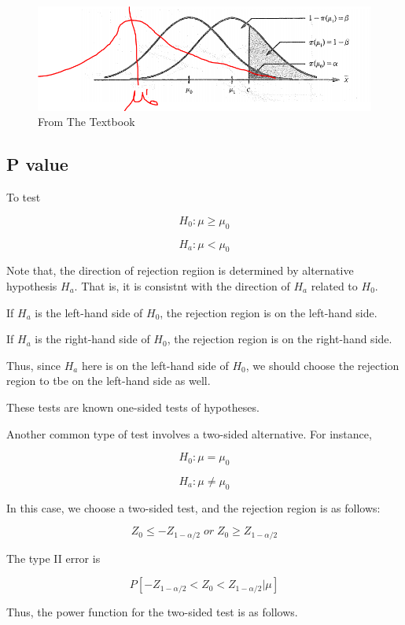 \documentclass[]{book}
\begin{document}
\begin{figure}
\centering
\includegraphics{556_2.PNG}
\caption{From The Textbook}
\end{figure}

\hypertarget{p-value}{%
\subsection{P value}\label{p-value}}

To test

\[H_0: \mu \geq \mu_0\]

\[H_a:\mu < \mu_0\]

Note that, the direction of rejection regiion is determined by alternative hypothesis \(H_a\). That is, it is consistnt with the direction of \(H_a\) related to \(H_0\).

If \(H_a\) is the left-hand side of \(H_0\), the rejection region is on the left-hand side.

If \(H_a\) is the right-hand side of \(H_0\), the rejection region is on the right-hand side.

Thus, since \(H_a\) here is on the left-hand side of \(H_0\), we should choose the rejection region to tbe on the left-hand side as well.

These tests are known one-sided tests of hypotheses.

Another common type of test involves a two-sided alternative. For instance,

\[H_0: \mu=\mu_0\]

\[H_a: \mu\neq \mu_0\]

In this case, we choose a two-sided test, and the rejection region is as follows:

\[Z_0 \leq -Z_{1-\alpha/2} \; or \; Z_0 \geq Z_{1-\alpha/2}\]

The type II error is

\[P[-Z_{1-\alpha/2} < Z_0 < Z_{1-\alpha/2}| \mu]\]

Thus, the power function for the two-sided test is as follows.
\end{document}
